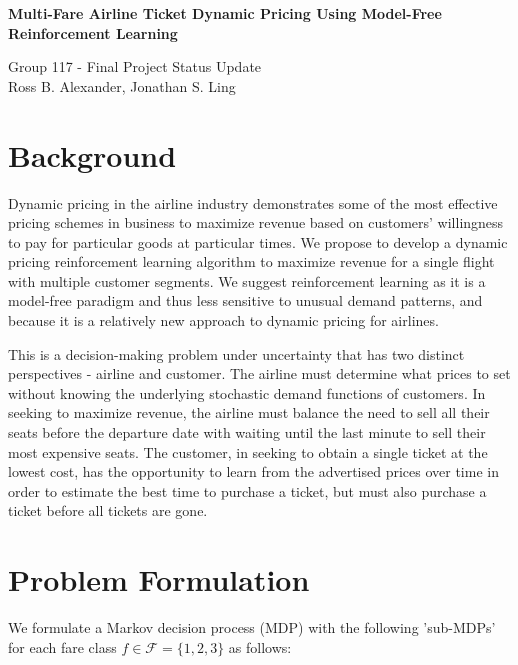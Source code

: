 \documentclass[10pt,letterpaper]{article}
\begin{document}

\begin{center}
\textbf{\LARGE Multi-Fare Airline Ticket Dynamic Pricing Using Model-Free Reinforcement Learning}

{\Small Group 117 - Final Project Status Update \\ \Small Ross B. Alexander, Jonathan S. Ling}
\end{center}

\begin{multicols*}{2}

\section*{Background}
Dynamic pricing in the airline industry demonstrates some of the most effective pricing schemes in business to maximize revenue based on customers' willingness to pay for particular goods at particular times. We propose to develop a dynamic pricing reinforcement learning algorithm to maximize revenue for a single flight with multiple customer segments. We suggest reinforcement learning as it is a model-free paradigm and thus less sensitive to unusual demand patterns, and because it is a relatively new approach to dynamic pricing for airlines.

This is a decision-making problem under uncertainty that has two distinct perspectives - airline and customer. The airline must determine what prices to set without knowing the underlying stochastic demand functions of customers. In seeking to maximize revenue, the airline must balance the need to sell all their seats before the departure date with waiting until the last minute to sell their most expensive seats. The customer, in seeking to obtain a single ticket at the lowest cost, has the opportunity to learn from the advertised prices over time in order to estimate the best time to purchase a ticket, but must also purchase a ticket before all tickets are gone.

\section*{Problem Formulation}
We formulate a Markov decision process (MDP) with the following 'sub-MDPs' for each fare class $f \in \mathcal{F} = \{ 1,2,3 \}$ as follows:


\end{multicols*}
\end{document}
